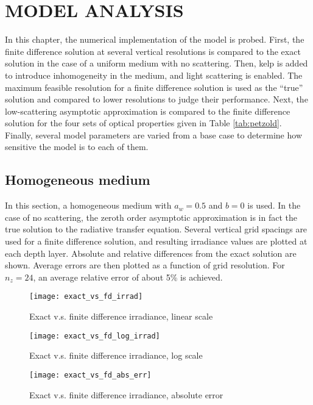 \chapter{MODEL ANALYSIS}
\label{chap:model_analysis}

In this chapter, the numerical implementation of the model is probed.
First, the finite difference solution at several vertical resolutions
is compared to the exact solution in the case of a uniform medium with no scattering.
Then, kelp is added to introduce inhomogeneity in the medium, and light scattering is enabled.
The maximum feasible resolution for a finite difference solution is used as the ``true'' solution
and compared to lower resolutions to judge their performance.
Next, the low-scattering asymptotic approximation is compared to the finite difference solution
for the four sets of optical properties given in Table \ref{tab:petzold}.
Finally, several model parameters are varied from a base case to determine how sensitive the model is to each of them. 


\section{Homogeneous medium}
In this section, a homogeneous medium with $a_w=0.5$ and $b=0$ is used.
In the case of no scattering, the zeroth order asymptotic approximation
is in fact the true solution to the radiative transfer equation.
Several vertical grid spacings are used for a finite difference solution,
and resulting irradiance values are plotted at each depth layer.
Absolute and relative differences from the exact solution are shown.
Average errors are then plotted as a function of grid resolution.
For $n_z=24$, an average relative error of about 5\% is achieved.

\begin{figure}[H]
  \centering
  \texttt{[image: exact\_vs\_fd\_irrad]}
  \caption{Exact v.s. finite difference irradiance, linear scale}
\end{figure}

\begin{figure}[H]
  \centering
  \texttt{[image: exact\_vs\_fd\_log\_irrad]}
  \caption{Exact v.s. finite difference irradiance, log scale}
\end{figure}

\begin{figure}[H]
  \centering
  \texttt{[image: exact\_vs\_fd\_abs\_err]}
  \caption{Exact v.s. finite difference irradiance, absolute error}
\end{figure}

